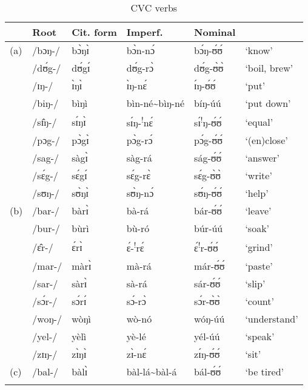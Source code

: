 \documentclass[output=paper
,newtxmath
,modfonts
,nonflat]{langsci/langscibook}
\begin{document}
\begin{table}
\begin{tabularx}{\textwidth}{llXXXX} 
\lsptoprule
& {Root} & {Cit. form} & {Imperf.} & {Nominal} & \\
\midrule
(a)&	/bɔŋ-/&	bɔ̀ŋɪ̀	&bɔ̀n-nɔ́ &	bɔ́ŋ-ʊ́ʊ́&	‘know’\\
&	/dʊ́g-/&	dʊ́gɪ́	&dʊ́g-rɔ̀	&	dʊ́g-ʊ̀ʊ̀	&‘boil, brew’\\
&	/ɪŋ-/&	ɪ̀ŋɪ̀	&ɪ̀ŋ-nɛ́	&ɪ́ŋ-ʊ́ʊ́&	‘put’\\
&	/biŋ-/&	bìŋì	&bìn-né{\textasciitilde}bìŋ-né &	bíŋ-úú	&‘put down’\\
&	/sɪ̂ŋ-/&	sɪ́ŋɪ̀	&sɪ́ŋ-\textsuperscript{!}nɛ́&	sɪ́\textsuperscript{!}ŋ-ʊ́ʊ́&	‘equal’\\
&	/pɔg-/&	pɔ̀gɪ̀	&pɔ̀g-rɔ́&	pɔ́g-ʊ́ʊ́	&‘(en)close’\\
&	/sag-/&	sàgɪ̀	&sàg-rá&	ság-ʊ́ʊ́	&‘answer’\\
&	/sɛ́g-/&	sɛ́gɪ́	&sɛ́g-rɛ̀&	sɛ́g-ʊ̀ʊ̀&	‘write’\\
&	/sʊŋ-/&	sʊ̀ŋɪ̀	&sʊ̀ŋ-nɔ́	&sʊ́ŋ-ʊ́ʊ́	&‘help’\\
(b)	&/bar-/&	bàrɪ̀	&bà-rá	&bár-ʊ́ʊ́	&‘leave’\\
&	/bur-/&	bùrì	&bù-ró	& búr-úú		&‘soak’\\
&	/ɛ̂r-/	&ɛ́rɪ̀	&ɛ́-\textsuperscript{!}rɛ́	&ɛ́\textsuperscript{!}r-ʊ́ʊ́	&‘grind’\\
&	/mar-/&	màrɪ̀	&mà-rá&	már-ʊ́ʊ́	&‘paste’\\
&	/sar-/	&sàrɪ̀	&sà-rá&	sár-ʊ́ʊ́	&‘slip’\\
&	/sɔ́r-/	&sɔ́rɪ́	&sɔ́-rɔ̀	&sɔ́r-ʊ̀ʊ̀	&‘count’\\
&	/woŋ-/&	wòŋì	&wò-nó	&wóŋ-úú&	‘understand’\\
&	/yel-/&	yèlì	&yè-lé	&yél-úú&	‘speak’\\
&	/zɪŋ-/	&zɪ̀ŋɪ̀	&zɪ̀-nɛ́	&zɪ́ŋ-ʊ́ʊ́	&‘sit’\\
(c)	&/bal-/&	bàlɪ̀	&bàl-lá{\textasciitilde}bàl-á	&bál-ʊ́ʊ́		&‘be tired’\\
\lspbottomrule
\end{tabularx}
\caption{CVC verbs}
\label{tab:anttila:9}
\end{table}
\end{document}
